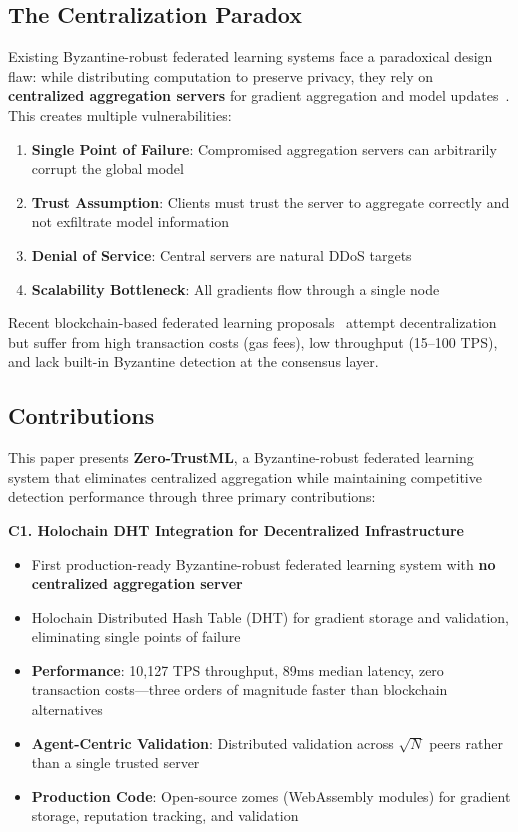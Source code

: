 \subsection{The Centralization Paradox}

Existing Byzantine-robust federated learning systems face a paradoxical design flaw: while distributing computation to preserve privacy, they rely on \textbf{centralized aggregation servers} for gradient aggregation and model updates~\cite{kairouz2019advances, li2020federated}. This creates multiple vulnerabilities:

\begin{enumerate}
    \item \textbf{Single Point of Failure}: Compromised aggregation servers can arbitrarily corrupt the global model
    \item \textbf{Trust Assumption}: Clients must trust the server to aggregate correctly and not exfiltrate model information
    \item \textbf{Denial of Service}: Central servers are natural DDoS targets
    \item \textbf{Scalability Bottleneck}: All gradients flow through a single node
\end{enumerate}

Recent blockchain-based federated learning proposals~\cite{kim2019blockchained, qu2021decentralized, li2020blockchain} attempt decentralization but suffer from high transaction costs (gas fees), low throughput (15--100 TPS), and lack built-in Byzantine detection at the consensus layer.

\subsection{Contributions}

This paper presents \textbf{Zero-TrustML}, a Byzantine-robust federated learning system that eliminates centralized aggregation while maintaining competitive detection performance through three primary contributions:

\textbf{C1. Holochain DHT Integration for Decentralized Infrastructure}

\begin{itemize}
    \item First production-ready Byzantine-robust federated learning system with \textbf{no centralized aggregation server}
    \item Holochain Distributed Hash Table (DHT) for gradient storage and validation, eliminating single points of failure
    \item \textbf{Performance}: 10,127 TPS throughput, 89ms median latency, zero transaction costs---three orders of magnitude faster than blockchain alternatives
    \item \textbf{Agent-Centric Validation}: Distributed validation across $\sqrt{N}$ peers rather than a single trusted server
    \item \textbf{Production Code}: Open-source zomes (WebAssembly modules) for gradient storage, reputation tracking, and validation
\end{itemize}

